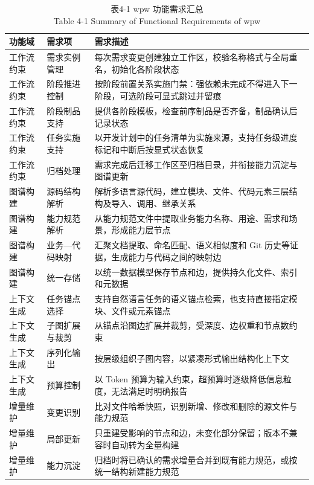 \begin{table}[htbp]
\centering
\small
\caption{表4-1 wpw 功能需求汇总\\Table 4-1 Summary of Functional Requirements of wpw}
\begin{tabularx}{\textwidth}{|X|X|X|}
\hline
\textbf{功能域} & \textbf{需求项} & \textbf{需求描述} \\
\hline
工作流约束 & 需求实例管理 & 每次需求变更创建独立工作区，校验名称格式与全局重名，初始化各阶段状态 \\
工作流约束 & 阶段推进控制 & 按阶段前置关系实施门禁：强依赖未完成不得进入下一阶段，可选阶段可显式跳过并留痕 \\
工作流约束 & 阶段制品支持 & 提供各阶段模板，检查前序制品是否齐备，制品确认后记录状态 \\
工作流约束 & 任务实施支持 & 以开发计划中的任务清单为实施来源，支持任务级进度标记和中断后按显式状态恢复 \\
工作流约束 & 归档处理 & 需求完成后迁移工作区至归档目录，并衔接能力沉淀与图谱更新 \\
图谱构建 & 源码结构解析 & 解析多语言源代码，建立模块、文件、代码元素三层结构及导入、调用、继承关系 \\
图谱构建 & 能力规范解析 & 从能力规范文件中提取业务能力名称、用途、需求和场景，形成能力层节点 \\
图谱构建 & 业务—代码映射 & 汇聚文档提取、命名匹配、语义相似度和 Git 历史等证据，生成能力与代码之间的映射边 \\
图谱构建 & 统一存储 & 以统一数据模型保存节点和边，提供持久化文件、索引和元数据 \\
上下文生成 & 任务锚点选择 & 支持自然语言任务的语义锚点检索，也支持直接指定模块、文件或元素锚点 \\
上下文生成 & 子图扩展与裁剪 & 从锚点沿图边扩展并裁剪，受深度、边权重和节点数约束 \\
上下文生成 & 序列化输出 & 按层级组织子图内容，以紧凑形式输出结构化上下文 \\
上下文生成 & 预算控制 & 以 Token 预算为输入约束，超预算时逐级降低信息粒度，无法满足时明确报告 \\
增量维护 & 变更识别 & 比对文件哈希快照，识别新增、修改和删除的源文件与能力规范 \\
增量维护 & 局部更新 & 只重建受影响的节点和边，未变化部分保留；版本不兼容时自动转为全量构建 \\
增量维护 & 能力沉淀 & 归档时将已确认的需求增量合并到既有能力规范，或按统一结构新建能力规范 \\
\hline
\end{tabularx}
\end{table}


